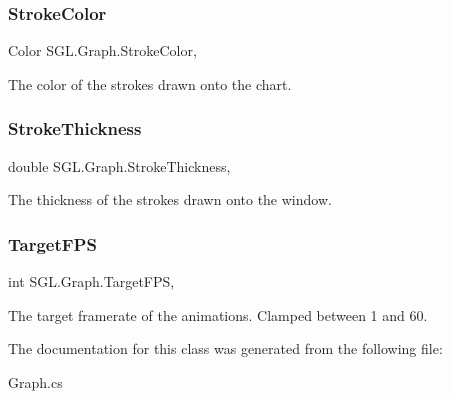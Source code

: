 \mbox{\label{class_s_g_l_1_1_graph_af81e9aa32beac23df901a2483d0064d2}} 
\subsubsection{\texorpdfstring{Stroke\+Color}{StrokeColor}}
{\footnotesize\ttfamily Color S\+G\+L.\+Graph.\+Stroke\+Color\hspace{0.3cm}{\ttfamily [get]}, {\ttfamily [set]}}



The color of the strokes drawn onto the chart. 

\mbox{\label{class_s_g_l_1_1_graph_a40051c7b2a49c71f4dad7fef5b1e44ef}} 
\subsubsection{\texorpdfstring{Stroke\+Thickness}{StrokeThickness}}
{\footnotesize\ttfamily double S\+G\+L.\+Graph.\+Stroke\+Thickness\hspace{0.3cm}{\ttfamily [get]}, {\ttfamily [set]}}



The thickness of the strokes drawn onto the window. 

\mbox{\label{class_s_g_l_1_1_graph_a60259b98072e0e872544a1175e4da5d5}} 
\subsubsection{\texorpdfstring{Target\+F\+PS}{TargetFPS}}
{\footnotesize\ttfamily int S\+G\+L.\+Graph.\+Target\+F\+PS\hspace{0.3cm}{\ttfamily [get]}, {\ttfamily [set]}}



The target framerate of the animations. Clamped between 1 and 60. 



The documentation for this class was generated from the following file\+:\begin{DoxyCompactItemize}
\item 
Graph.\+cs\end{DoxyCompactItemize}
